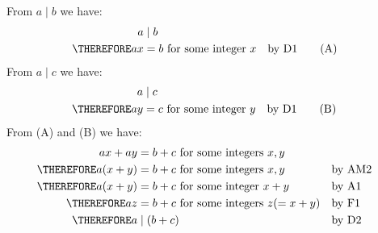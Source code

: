 From $a \mid b$ we have:
\begin{align*}
a &\mid b  \\
\THEREFORE ax &= b \text{ for some integer $x$} & & \text{by D1} \tag{A}
\end{align*}
From $a \mid c$ we have:
\begin{align*}
a &\mid c  \\
\THEREFORE ay &= c \text{ for some integer $y$} & & \text{by D1} \tag{B}
\end{align*}
From (A) and (B) we have:
\begin{align*}
           ax + ay &= b + c \text{ for some integers $x, y$}               \\
\THEREFORE a(x+y)  &= b + c \text{ for some integers $x, y$}     & & \text{by AM2} \\
\THEREFORE a(x+y)  &= b + c \text{ for some integer $x + y$}     & & \text{by A1} \\
\THEREFORE az  &= b + c \text{ for some integers $z (= x+y)$}  & & \text{by F1} \\
\THEREFORE a   &\mid (b+c)                                       & & \text{by D2} 
\end{align*}

